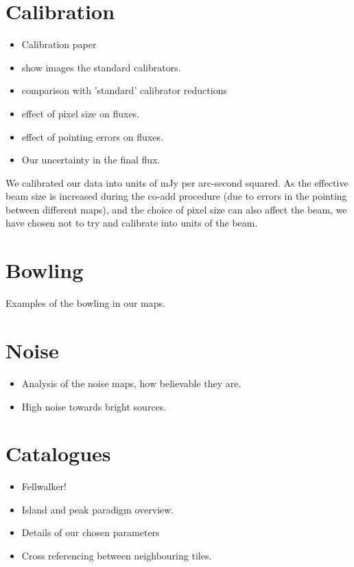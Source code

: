 \documentclass[usenatbib]{mn2e}
\begin{document}
\section{Calibration}
\begin{itemize}
\item Calibration paper \citep{2013MNRAS.430.2534D}
\item show images the standard calibrators.
\item comparison with 'standard' calibrator reductions
\item effect of pixel size on fluxes.
\item effect of pointing errors on fluxes.
\item Our uncertainty in the final flux.
\end{itemize}


We calibrated our data into units of mJy per arc-second squared.
As the effective beam size is increased during the co-add procedure
(due to errors in the pointing between different maps), and the choice
of pixel size can also affect the beam, we have chosen not to try and
calibrate into units of the beam.


\section{Bowling}
Examples of the bowling in our maps.

\section{Noise}
\begin{itemize}
\item Analysis of the noise maps, how believable they are.
\item High noise towards bright sources.
\end{itemize}



\section{Catalogues}
\begin{itemize}
\item Fellwalker! \citep{2015A&C....10...22B}
\item Island and peak paradigm overview.
\item Details of our chosen parameters
\item Cross referencing between neighbouring tiles.
\end{itemize}
\end{document}
